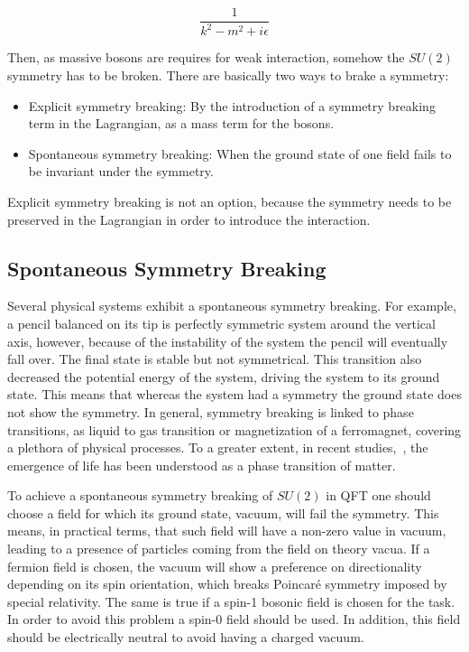 \begin{equation}
  \label{eq:Propa}
  \frac{1}{k^{2}-m^{2}+i\epsilon}
\end{equation}

Then, as massive bosons are requires for weak interaction, somehow the $SU(2)$ symmetry has to be broken. There are basically two ways to brake a symmetry: 
\begin{itemize}
\item Explicit symmetry breaking: By the introduction of a symmetry breaking term in the Lagrangian, as a mass term for the bosons.
\item Spontaneous symmetry breaking: When the ground state of one field fails to be invariant under the symmetry. 
\end{itemize}

Explicit symmetry breaking is not an option, because the symmetry needs to be preserved in the Lagrangian in order to introduce the interaction.

\subsection{Spontaneous Symmetry Breaking}
\label{sec:SSB}

Several physical systems exhibit a spontaneous symmetry breaking. For example, a pencil balanced on its tip is perfectly symmetric system around the vertical axis, however, because of the instability of the system the pencil will eventually fall over. The final state is stable but not symmetrical. This transition also decreased the potential energy of the system, driving the system to its ground state. This means that whereas the system had a symmetry the ground state does not show the symmetry. In general, symmetry breaking is linked to phase transitions, as liquid to gas transition or magnetization of a ferromagnet, covering a plethora of physical processes. To a greater extent, in recent studies,~\cite{2015arXiv150302776M}, the emergence of life has been understood as a phase transition of matter. 

To achieve a spontaneous symmetry breaking of $SU(2)$ in QFT one should choose a field for which its ground state, vacuum, will fail the symmetry. This means, in practical terms, that such field will have a non-zero value in vacuum, leading to a presence of particles coming from the field on theory vacua. If a fermion field is chosen, the vacuum will show a preference on directionality depending on its spin orientation, which breaks Poincar\'{e} symmetry imposed by special relativity. The same is true if a spin-1 bosonic field is chosen for the task. In order to avoid this problem a spin-0 field should be used. In addition, this field should be electrically neutral to avoid having a charged vacuum.

